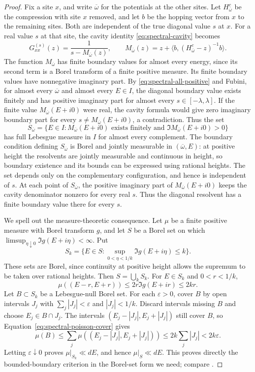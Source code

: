\begin{proof}
Fix a site $x$, and write $\overline\omega$ for the potentials at
the other sites. Let $H^c_{\overline\omega}$ be the compression with
site $x$ removed, and let $b$ be the hopping vector from $x$ to the
remaining sites. Both are independent of the true diagonal value
$s$ at $x$. For a real value $s$ at that site, the cavity identity
\eqref{eq:spectral-cavity} becomes
\[
 G_{xx}^{(s)}(z)=\frac1{s-M_{\overline\omega}(z)},\qquad
 M_{\overline\omega}(z)
 =z+\langle b,(H^c_{\overline\omega}-z)^{-1}b\rangle.
\]
The function $M_{\overline\omega}$ has finite boundary values
for almost every energy, since its second term is a Borel
transform of a finite positive measure. Its finite boundary values
have nonnegative imaginary part. By
\eqref{eq:spectral-all-positive} and Fubini, for almost every
$\overline\omega$ and almost every $E\in I$, the diagonal boundary
value exists finitely and has positive imaginary part for almost every
$s\in[-\lambda,\lambda]$.
If the finite value
$M_{\overline\omega}(E+i0)$ were real, the cavity formula would
give zero imaginary boundary part for every
$s\ne M_{\overline\omega}(E+i0)$, a contradiction. Thus the set
\[
 S_{\overline\omega}
 =\{E\in I:M_{\overline\omega}(E+i0)\text{ exists finitely and }
                      \Im M_{\overline\omega}(E+i0)>0\}
\]
has full Lebesgue measure in $I$ for almost every complement.
The boundary condition defining $S_{\overline\omega}$ is Borel and
jointly measurable in $(\overline\omega,E)$: at positive height the
resolvents are jointly measurable and continuous in height, so boundary
existence and its bounds can be expressed using rational heights.
The set depends only on the complementary configuration, and hence
is independent of $s$. At each point of $S_{\overline\omega}$, the
positive imaginary part of $M_{\overline\omega}(E+i0)$ keeps the cavity
denominator nonzero for every real $s$. Thus the diagonal resolvent has
a finite boundary value there for every $s$.

We spell out the measure-theoretic consequence. Let $\mu$ be a
finite positive measure with Borel transform $g$, and let $S$ be
a Borel set on which
$\limsup_{\eta\downarrow0}\Im g(E+i\eta)<\infty$. Put
\[
 S_k=\{E\in S:\sup_{0<\eta<1/k}\Im g(E+i\eta)\le k\}.
\]
These sets are Borel, since continuity at positive height allows the
supremum to be taken over rational heights. Then $S=\bigcup_k S_k$.
For $E\in S_k$ and $0<r<1/k$,
\begin{equation}\label{eq:spectral-poisson-cover}
 \mu((E-r,E+r))\le2r\Im g(E+ir)\le2kr.
\end{equation}
Let $B\subset S_k$ be a Lebesgue-null Borel set. For each
$\varepsilon>0$, cover $B$ by open intervals $J_j$ with
$\sum_j|J_j|<\varepsilon$ and $|J_j|<1/k$.
Discard intervals missing $B$ and choose $E_j\in B\cap J_j$.
The intervals $(E_j-|J_j|,E_j+|J_j|)$ still cover $B$, so
Equation~\eqref{eq:spectral-poisson-cover} gives
\[
 \mu(B)\le\sum_j\mu((E_j-|J_j|,E_j+|J_j|))
 \le2k\sum_j|J_j|<2k\varepsilon.
\]
Letting $\varepsilon\downarrow0$ proves $\mu|_{S_k}\ll dE$, and hence
$\mu|_S\ll dE$. This proves directly the bounded-boundary
criterion in the Borel-set form we need; compare
\cite[Theorem~3.23 and Corollary~3.24]{Teschl2009}.


\end{proof}
